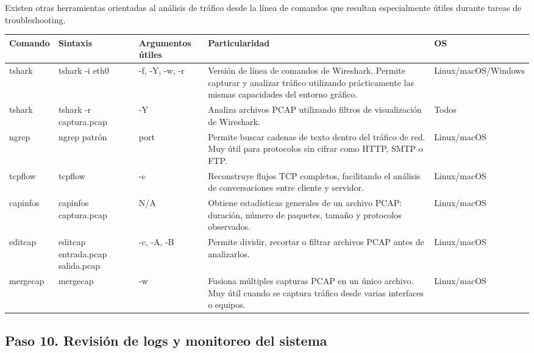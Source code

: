 \documentclass[a4paper,10pt]{article}
\begin{document}
Existen otras herramientas orientadas al análisis de tráfico desde la línea de
comandos que resultan especialmente útiles durante tareas de troubleshooting.

\begin{longtable}{|p{2.8cm}|p{3cm}|p{4cm}|p{5.6cm}|p{1.5cm}|}

\hline
Comando &
Sintaxis &
Argumentos útiles &
Particularidad &
OS
\\
\hline
\endhead

tshark &
tshark -i eth0 &
-f, -Y, -w, -r &
Versión de línea de comandos de Wireshark. Permite capturar y analizar tráfico utilizando prácticamente las mismas capacidades del entorno gráfico. &
Linux/macOS/Windows
\\
\hline

tshark &
tshark -r captura.pcap &
-Y &
Analiza archivos PCAP utilizando filtros de visualización de Wireshark. &
Todos
\\
\hline

ngrep &
ngrep patrón &
port &
Permite buscar cadenas de texto dentro del tráfico de red. Muy útil para protocolos sin cifrar como HTTP, SMTP o FTP. &
Linux/macOS
\\
\hline

tcpflow &
tcpflow &
-c &
Reconstruye flujos TCP completos, facilitando el análisis de conversaciones entre cliente y servidor. &
Linux/macOS
\\
\hline

capinfos &
capinfos captura.pcap &
N/A &
Obtiene estadísticas generales de un archivo PCAP: duración, número de paquetes, tamaño y protocolos observados. &
Linux/macOS
\\
\hline

editcap &
editcap entrada.pcap salida.pcap &
-c, -A, -B &
Permite dividir, recortar o filtrar archivos PCAP antes de analizarlos. &
Linux/macOS
\\
\hline

mergecap &
mergecap &
-w &
Fusiona múltiples capturas PCAP en un único archivo. Muy útil cuando se captura tráfico desde varias interfaces o equipos. &
Linux/macOS
\\
\hline

\end{longtable}



\subsection{Paso 10. Revisión de logs y monitoreo del sistema}
\end{document}
